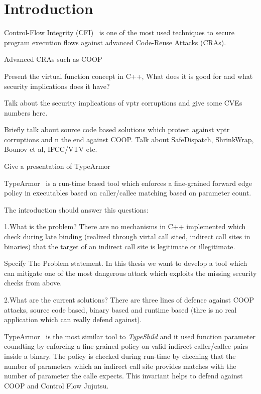 \chapter{Introduction}
\label{chapter:Introduction}
Control-Flow Integrity (CFI)~\cite{abadi:cfi, abadi:cfi2} is one of the most used techniques
to secure program execution flows against advanced Code-Reuse Attacks (CRAs).

Advanced CRAs such as COOP~\cite{schuster:coop}

Present the virtual function concept in C++, What does it is good for and what security implications does it have?

Talk about the security implications of vptr corruptions and give some CVEs numbers here.

Briefly talk about source code based solutions which protect against vptr corruptions and n the 
end against COOP. Talk about SafeDispatch, ShrinkWrap, Bounov et al, IFCC/VTV etc.


Give a presentation of TypeArmor

TypeArmor~\cite{veen:typearmor} is a run-time based
tool which enforces a fine-grained forward edge policy
in executables based on caller/callee matching based on 
parameter count. 

The introduction should answer this questions:

1.What is the problem? 
There are no mechanisms in C++ implemented which check during late binding
(realized through virtal call sited, indirect call sites in binaries) that
the target of an indirect call site is legitimate or illegitimate.

Specify The Problem statement. 
In this thesis we want to develop a tool which can mitigate one 
of the most dangerous attack which exploits the missing security checks from above.

2.What are the current solutions?
There are three lines of defence against COOP attacks, source code based,
binary based and runtime based (thre is no real application which can really defend against).

TypeArmor~\cite{veen:typearmor} is the most similar tool to \textit{TypeShild} and it used
function parameter coundting by enforcing a fine-grained policy on valid indirect caller/callee pairs
inside a binary. The policy is checked during run-time by cheching that the number of parameters which 
an indirect call site provides matches with the number of parameter the calle expects. This invariant
helps to defend against COOP and Control Flow Jujutsu.


